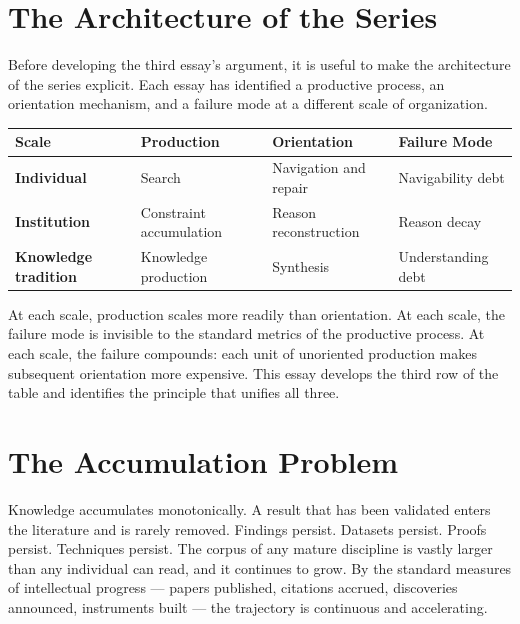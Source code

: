 
\section*{The Architecture of the Series}

Before developing the third essay's argument, it is useful to make the
architecture of the series explicit. Each essay has identified a productive
process, an orientation mechanism, and a failure mode at a different scale
of organization.

\bigskip
\begin{center}
\begin{tabular}{>{\bfseries}p{3cm} p{3cm} p{3.2cm} p{3.5cm}}
\toprule
Scale & Production & Orientation & Failure Mode \\
\midrule
Individual & Search & Navigation and repair & Navigability debt \\[0.4em]
Institution & Constraint accumulation & Reason reconstruction & Reason decay \\[0.4em]
Knowledge tradition & Knowledge production & Synthesis & Understanding debt \\
\bottomrule
\end{tabular}
\end{center}
\bigskip

At each scale, production scales more readily than orientation. At each scale,
the failure mode is invisible to the standard metrics of the productive process.
At each scale, the failure compounds: each unit of unoriented production makes
subsequent orientation more expensive. This essay develops the third row of
the table and identifies the principle that unifies all three.

\newpage

\section{The Accumulation Problem}

Knowledge accumulates monotonically. A result that has been validated enters
the literature and is rarely removed. Findings persist. Datasets persist.
Proofs persist. Techniques persist. The corpus of any mature discipline is
vastly larger than any individual can read, and it continues to grow. By the
standard measures of intellectual progress --- papers published, citations
accrued, discoveries announced, instruments built --- the trajectory is
continuous and accelerating.

